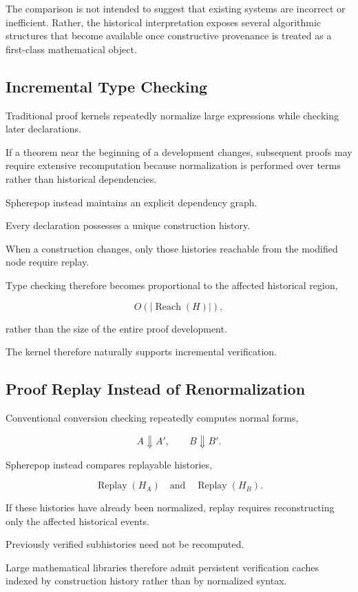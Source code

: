 \documentclass[12pt,oneside]{article}
\theoremstyle{definition}
\theoremstyle{remark}
\DeclareMathOperator{\Replay}{Replay}
\begin{document}
The comparison is not intended to suggest that existing systems are incorrect or
inefficient. Rather, the historical interpretation exposes several algorithmic
structures that become available once constructive provenance is treated as a
first-class mathematical object.

\subsection{Incremental Type Checking}

Traditional proof kernels repeatedly normalize large expressions while checking
later declarations.

If a theorem near the beginning of a development changes, subsequent proofs may
require extensive recomputation because normalization is performed over terms
rather than historical dependencies.

Spherepop instead maintains an explicit dependency graph.

Every declaration possesses a unique construction history.

When a construction changes, only those histories reachable from the modified
node require replay.

Type checking therefore becomes proportional to the affected historical region,

\[
O(|\operatorname{Reach}(H)|),
\]

rather than the size of the entire proof development.

The kernel therefore naturally supports incremental verification.

\subsection{Proof Replay Instead of Renormalization}

Conventional conversion checking repeatedly computes normal forms,

\[
A
\Downarrow
A',
\qquad
B
\Downarrow
B'.
\]

Spherepop instead compares replayable histories,

\[
\Replay(H_A)
\quad\text{and}\quad
\Replay(H_B).
\]

If these histories have already been normalized, replay requires reconstructing
only the affected historical events.

Previously verified subhistories need not be recomputed.

Large mathematical libraries therefore admit persistent verification caches
indexed by construction history rather than by normalized syntax.
\end{document}
